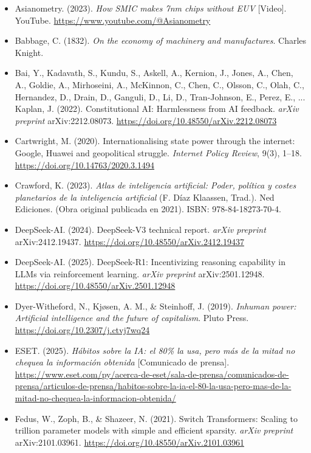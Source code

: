 \begin{itemize}[leftmargin=1.5em, label={}, itemsep=0.22ex, parsep=0pt]
\small\raggedright
{}
    \item Asianometry. (2023). \textit{How SMIC makes 7nm chips without EUV} [Video]. YouTube. \url{https://www.youtube.com/@Asianometry}
    \item Babbage, C. (1832). \textit{On the economy of machinery and manufactures}. Charles Knight.
    \item Bai, Y., Kadavath, S., Kundu, S., Askell, A., Kernion, J., Jones, A., Chen, A., Goldie, A., Mirhoseini, A., McKinnon, C., Chen, C., Olsson, C., Olah, C., Hernandez, D., Drain, D., Ganguli, D., Li, D., Tran-Johnson, E., Perez, E., ... Kaplan, J. (2022). Constitutional AI: Harmlessness from AI feedback. \textit{arXiv preprint} arXiv:2212.08073. \url{https://doi.org/10.48550/arXiv.2212.08073}
    \item Cartwright, M. (2020). Internationalising state power through the internet: Google, Huawei and geopolitical struggle. \textit{Internet Policy Review}, 9(3), 1--18. \url{https://doi.org/10.14763/2020.3.1494}
    \item Crawford, K. (2023). \textit{Atlas de inteligencia artificial: Poder, política y costes planetarios de la inteligencia artificial} (F. Díaz Klaassen, Trad.). Ned Ediciones. (Obra original publicada en 2021). ISBN: 978-84-18273-70-4.
    \item DeepSeek-AI. (2024). DeepSeek-V3 technical report. \textit{arXiv preprint} arXiv:2412.19437. \url{https://doi.org/10.48550/arXiv.2412.19437}
    \item DeepSeek-AI. (2025). DeepSeek-R1: Incentivizing reasoning capability in LLMs via reinforcement learning. \textit{arXiv preprint} arXiv:2501.12948. \url{https://doi.org/10.48550/arXiv.2501.12948}
    \item Dyer-Witheford, N., Kjøsen, A. M., \& Steinhoff, J. (2019). \textit{Inhuman power: Artificial intelligence and the future of capitalism}. Pluto Press. \url{https://doi.org/10.2307/j.ctvj7wq24}
    \item ESET. (2025). \textit{Hábitos sobre la IA: el 80\% la usa, pero más de la mitad no chequea la información obtenida} [Comunicado de prensa]. \url{https://www.eset.com/py/acerca-de-eset/sala-de-prensa/comunicados-de-prensa/articulos-de-prensa/habitos-sobre-la-ia-el-80-la-usa-pero-mas-de-la-mitad-no-chequea-la-informacion-obtenida/}
    \item Fedus, W., Zoph, B., \& Shazeer, N. (2021). Switch Transformers: Scaling to trillion parameter models with simple and efficient sparsity. \textit{arXiv preprint} arXiv:2101.03961. \url{https://doi.org/10.48550/arXiv.2101.03961}

\end{itemize}
